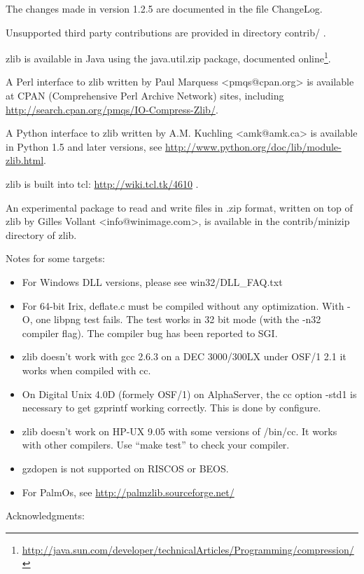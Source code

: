 The changes made in version 1.2.5 are documented in the file ChangeLog.

Unsupported third party contributions are provided in directory contrib/ .

zlib is available in Java using the java.util.zip package, documented online\footnote{\url{http://java.sun.com/developer/technicalArticles/Programming/compression/}}.

A Perl interface to zlib written by Paul Marquess \textless{}pmqs@cpan.org\textgreater{} is available at CPAN (Comprehensive Perl Archive Network) sites, including \url{http://search.cpan.org/pmqs/IO-Compress-Zlib/}.

A Python interface to zlib written by A.M. Kuchling \textless{}amk@amk.ca\textgreater{} is available in Python 1.5 and later versions, see \url{http://www.python.org/doc/lib/module-zlib.html}.

zlib is built into tcl: \url{http://wiki.tcl.tk/4610} .

An experimental package to read and write files in .zip format, written on top of zlib by Gilles Vollant \textless{}info@winimage.com\textgreater{}, is available in the contrib/minizip directory of zlib.

Notes for some targets:

\begin{itemize}
\item
  For Windows DLL versions, please see win32/DLL\_FAQ.txt
\item
  For 64-bit Irix, deflate.c must be compiled without any optimization. With -O, one libpng test fails. The test works in 32 bit mode (with the -n32~~ compiler flag). The compiler bug has been reported to SGI.
\item
  zlib doesn't work with gcc 2.6.3 on a DEC 3000/300LX under OSF/1 2.1 it works when compiled with cc.
\item
  On Digital Unix 4.0D (formely OSF/1) on AlphaServer, the cc option -std1 is necessary to get gzprintf working correctly. This is done by configure.
\item
  zlib doesn't work on HP-UX 9.05 with some versions of /bin/cc. It works with other compilers. Use ``make test'' to check your compiler.
\item
  gzdopen is not supported on RISCOS or BEOS.
\item
  For PalmOs, see \url{http://palmzlib.sourceforge.net/}
\end{itemize}

Acknowledgments:

